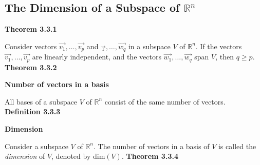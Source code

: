 \subsection{The Dimension of a Subspace of \texorpdfstring{$\mathbb{R}^{n}$}{R^n}}
\textbf{Theorem 3.3.1}\\
\par\noindent Consider vectors $\vec{v_{1}},\ldots{},\vec{v_{p}}$ and $\vec{_{1}},\ldots{},\vec{w_{q}}$ in a subspace $V$ of $\mathbb{R}^{n}$. If the vectors $\vec{v_{1}},\ldots{},\vec{v_{p}}$ are linearly independent, and the vectors $\vec{w_{1}},\ldots{},\vec{w_{q}}$ span $V$, then $q\ge{}p$.
\textbf{Theorem 3.3.2}\\
\par\noindent\textbf{Number of vectors in a basis}
\par\noindent All bases of a subspace $V$ of $\mathbb{R}^{n}$ consist of the same number of vectors.
\textbf{Definition 3.3.3}\\
\par\noindent\textbf{Dimension}
\par\noindent Consider a subspace $V$ of $\mathbb{R}^{n}$. The number of vectors in a basis of $V$ is called the \textit{dimension} of $V$, denoted by $\textrm{dim}(V)$.
\textbf{Theorem 3.3.4}\\
